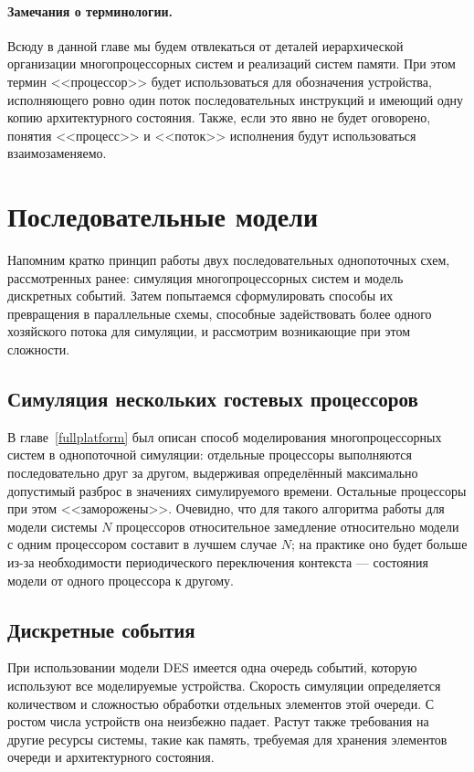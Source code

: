 \paragraph{Замечания о терминологии.} Всюду в данной главе мы будем отвлекаться от деталей иерархической организации многопроцессорных систем и реализаций систем памяти. При этом термин <<процессор>> будет использоваться для обозначения устройства, исполняющего ровно один поток последовательных инструкций и имеющий одну копию архитектурного состояния. Также, если это явно не будет оговорено, понятия <<процесс>> и <<поток>> исполнения будут использоваться взаимозаменяемо. 

\section{Последовательные модели}

Напомним кратко принцип работы двух последовательных однопоточных схем, рассмотренных ранее: симуляция многопроцессорных систем и модель дискретных событий. Затем попытаемся сформулировать способы их превращения в параллельные схемы, способные задействовать более одного хозяйского потока для симуляции, и рассмотрим возникающие при этом сложности.

\subsection{Симуляция нескольких гостевых процессоров}

В главе~\ref{fullplatform} был описан способ моделирования многопроцессорных систем в однопоточной симуляции: отдельные процессоры выполняются последовательно друг за другом, выдерживая определённый максимально допустимый разброс в значениях симулируемого времени. Остальные процессоры при этом <<заморожены>>. Очевидно, что для такого алгоритма работы для модели системы $N$ процессоров относительное замедление относительно модели с одним процессором составит в лучшем случае $N$; на практике оно будет больше из-за необходимости периодического переключения контекста — состояния модели от одного процессора к другому.

\subsection{Дискретные события}

При использовании модели DES имеется одна очередь событий, которую используют все моделируемые устройства. Скорость симуляции определяется количеством и сложностью обработки отдельных элементов этой очереди. С ростом числа устройств она неизбежно падает. Растут также требования на другие ресурсы системы, такие как память, требуемая для хранения элементов очереди и архитектурного состояния.

